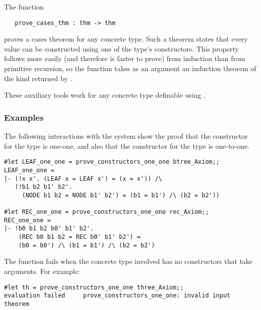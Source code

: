 The function

\begin{boxed}
\begin{verbatim}
   prove_cases_thm : thm -> thm
\end{verbatim}\end{boxed}

\noindent proves a cases
 theorem for any concrete type.  Such a theorem states that every
value can be constructed using one of the type's constructors.  This property
follows more easily (and therefore is faster to prove) from induction than from
primitive recursion, so the function  takes as an
argument an induction theorem of the kind returned by
.

These auxiliary tools work for any concrete type definable using
.

\subsubsection{Examples}

The following interactions with the system show the proof that the constructor
 for the type   is one-one,
and also that the constructor  for the type  is one-to-one.

\begin{session}\begin{verbatim}
#let LEAF_one_one = prove_constructors_one_one btree_Axiom;;
LEAF_one_one =
|- (!x x'. (LEAF x = LEAF x') = (x = x')) /\
   (!b1 b2 b1' b2'.
     (NODE b1 b2 = NODE b1' b2') = (b1 = b1') /\ (b2 = b2'))

#let REC_one_one = prove_constructors_one_one rec_Axiom;;
REC_one_one =
|- !b0 b1 b2 b0' b1' b2'.
    (REC b0 b1 b2 = REC b0' b1' b2') =
    (b0 = b0') /\ (b1 = b1') /\ (b2 = b2')
\end{verbatim}\end{session}

The function  fails when the concrete
type involved has no constructors that take arguments.  For example:

\begin{session}\begin{verbatim}
#let th = prove_constructors_one_one three_Axiom;;
evaluation failed     prove_constructors_one_one: invalid input theorem
\end{verbatim}\end{session}

